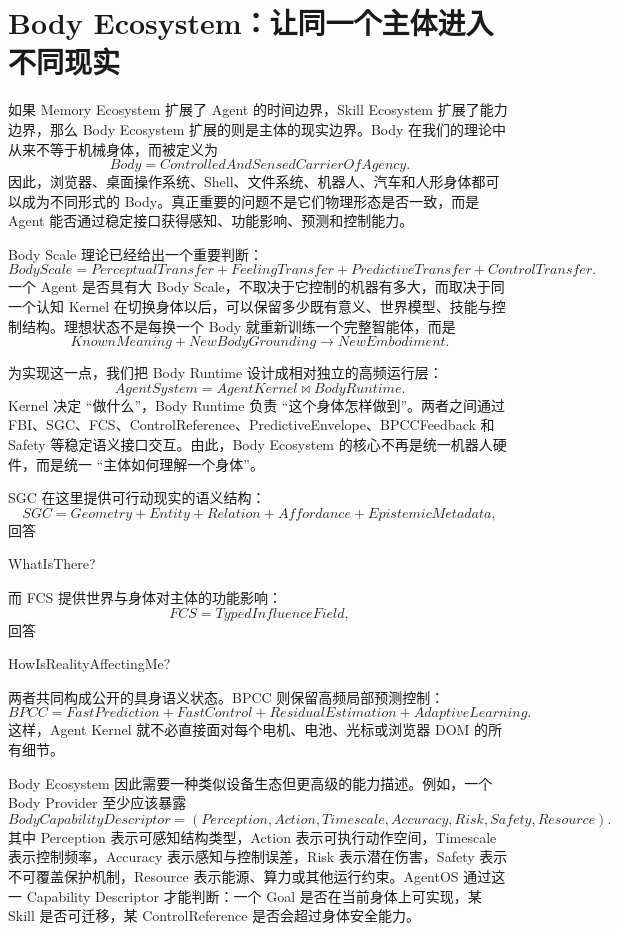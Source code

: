 \section{Body Ecosystem：让同一个主体进入不同现实}

如果 Memory Ecosystem 扩展了 Agent 的时间边界，Skill Ecosystem 扩展了能力边界，那么 Body Ecosystem 扩展的则是主体的现实边界。Body 在我们的理论中从来不等于机械身体，而被定义为
\[
\boxed{
Body
=
ControlledAndSensedCarrierOfAgency.
}
\]
因此，浏览器、桌面操作系统、Shell、文件系统、机器人、汽车和人形身体都可以成为不同形式的 Body。真正重要的问题不是它们物理形态是否一致，而是 Agent 能否通过稳定接口获得感知、功能影响、预测和控制能力。

Body Scale 理论已经给出一个重要判断：
\[
\boxed{
BodyScale
=
PerceptualTransfer
+
FeelingTransfer
+
PredictiveTransfer
+
ControlTransfer.
}
\]
一个 Agent 是否具有大 Body Scale，不取决于它控制的机器有多大，而取决于同一个认知 Kernel 在切换身体以后，可以保留多少既有意义、世界模型、技能与控制结构。理想状态不是每换一个 Body 就重新训练一个完整智能体，而是
\[
KnownMeaning
+
NewBodyGrounding
\rightarrow
NewEmbodiment.
\]

为实现这一点，我们把 Body Runtime 设计成相对独立的高频运行层：
\[
\boxed{
AgentSystem
=
AgentKernel
\bowtie
BodyRuntime.
}
\]
Kernel 决定 ``做什么''，Body Runtime 负责 ``这个身体怎样做到''。两者之间通过 FBI、SGC、FCS、ControlReference、PredictiveEnvelope、BPCCFeedback 和 Safety 等稳定语义接口交互。由此，Body Ecosystem 的核心不再是统一机器人硬件，而是统一 ``主体如何理解一个身体''。

SGC 在这里提供可行动现实的语义结构：
\[
SGC
=
Geometry
+
Entity
+
Relation
+
Affordance
+
EpistemicMetadata,
\]
回答
\begin{statementbox}
WhatIsThere?
\end{statementbox}
而 FCS 提供世界与身体对主体的功能影响：
\[
FCS
=
TypedInfluenceField,
\]
回答
\begin{statementbox}
HowIsRealityAffectingMe?
\end{statementbox}
两者共同构成公开的具身语义状态。BPCC 则保留高频局部预测控制：
\[
BPCC
=
FastPrediction
+
FastControl
+
ResidualEstimation
+
AdaptiveLearning.
\]
这样，Agent Kernel 就不必直接面对每个电机、电池、光标或浏览器 DOM 的所有细节。

Body Ecosystem 因此需要一种类似设备生态但更高级的能力描述。例如，一个 Body Provider 至少应该暴露
\[
BodyCapabilityDescriptor
=
(
Perception,
Action,
Timescale,
Accuracy,
Risk,
Safety,
Resource
).
\]
其中 Perception 表示可感知结构类型，Action 表示可执行动作空间，Timescale 表示控制频率，Accuracy 表示感知与控制误差，Risk 表示潜在伤害，Safety 表示不可覆盖保护机制，Resource 表示能源、算力或其他运行约束。AgentOS 通过这一 Capability Descriptor 才能判断：一个 Goal 是否在当前身体上可实现，某 Skill 是否可迁移，某 ControlReference 是否会超过身体安全能力。

